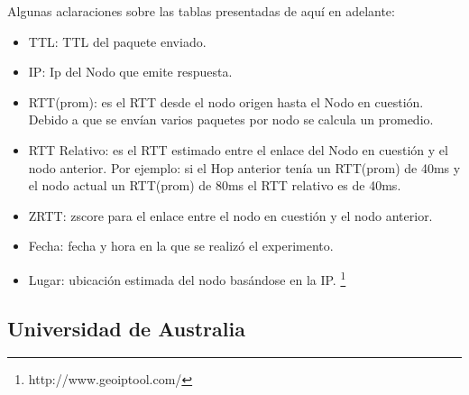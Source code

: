 Algunas aclaraciones sobre las tablas presentadas de aquí en adelante:
\begin{itemize}
\item TTL: TTL del paquete enviado.
\item IP: Ip del Nodo que emite respuesta.
\item RTT(prom): es el RTT desde el nodo origen hasta el Nodo en cuestión. Debido a que se envían varios paquetes por nodo se calcula un promedio.
\item RTT Relativo: es el RTT estimado entre el enlace del Nodo en cuestión y el nodo anterior. Por ejemplo: si el Hop anterior tenía un RTT(prom) de 40ms y el nodo actual un RTT(prom) de 80ms el RTT relativo es de 40ms.
\item ZRTT: zscore para el enlace entre el nodo en cuestión y el nodo anterior.
\item Fecha: fecha y hora en la que se realizó el experimento.
\item Lugar: ubicación estimada del nodo basándose en la IP. \footnote{http://www.geoiptool.com/}
\end{itemize}

\subsection{Universidad de Australia}


